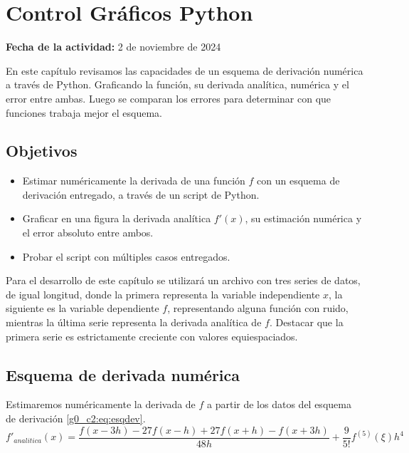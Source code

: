 \documentclass[../portafolio.tex]{subfiles}
\begin{document}
\chapter{Control Gráficos Python}
\label{g0_c2}
\hfill \textbf{Fecha de la actividad:} 2 de noviembre de 2024

\medskip

En este capítulo revisamos las capacidades de un esquema de derivación numérica a través de Python. Graficando la función, su derivada analítica, numérica y el error entre ambas. Luego se comparan los errores para determinar con que funciones trabaja mejor el esquema.

\section*{Objetivos}
\begin{itemize}
\item Estimar numéricamente la derivada de una función $f$ con un esquema de derivación entregado, a través de un script de Python.
\item Graficar 	en una figura la derivada analítica $f'(x)$, su estimación numérica y el error absoluto entre ambos.
\item Probar el script con múltiples casos entregados.
\end{itemize}

Para el desarrollo de este capítulo se utilizará un archivo con tres series de datos, de igual longitud, donde la primera representa la variable independiente $x$, la siguiente es la variable dependiente $f$, representando alguna función con ruido, mientras la última serie representa la derivada analítica de $f$. Destacar que la primera serie es estrictamente creciente con valores equiespaciados.
\section{Esquema de derivada numérica}
Estimaremos numéricamente la derivada de $f$ a partir de los datos del esquema de derivación \eqref{g0_c2:eq:esqdev}.
\begin{equation}\label{g0_c2:eq:esqdev}
f'_{analitica}(x)=\frac{f(x-3h)-27f(x-h)+27f(x+h)-f(x+3h)}{48h}+\frac{9}{5!}f^{(5)}(\xi)h^4
\end{equation}
\end{document}
